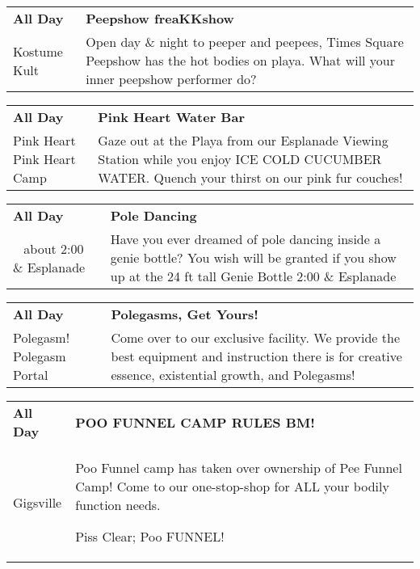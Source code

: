 \begin{tabular}{ p{1in} p{2.2in} }
    \textbf{All Day} & \textbf{Peepshow freaKKshow} \\
    Kostume Kult \newline  & Open day \& night to peeper and peepees, Times Square Peepshow has the hot bodies on playa. What will your inner peepshow performer do? \\
    \hline 
\end{tabular}
    
\begin{tabular}{ p{1in} p{2.2in} }
    \textbf{All Day} & \textbf{Pink Heart Water Bar} \\
    Pink Heart \newline Pink Heart Camp & Gaze out at the Playa from our Esplanade Viewing Station while you enjoy ICE COLD CUCUMBER WATER. Quench your thirst on our pink fur couches! \\
    \hline 
\end{tabular}
    
\begin{tabular}{ p{1in} p{2.2in} }
    \textbf{All Day} & \textbf{Pole Dancing} \\
    ~ \newline about 2:00 \& Esplanade & Have you ever dreamed of pole dancing inside a genie bottle? You wish will be granted if you show up at the 24 ft tall Genie Bottle 2:00 \& Esplanade \\
    \hline 
\end{tabular}
    
\begin{tabular}{ p{1in} p{2.2in} }
    \textbf{All Day} & \textbf{Polegasms, Get Yours!} \\
    Polegasm! \newline Polegasm Portal & Come over to our exclusive facility. We provide the best equipment and instruction there is for creative essence, existential growth, and Polegasms! \\
    \hline 
\end{tabular}
    
\begin{tabular}{ p{1in} p{2.2in} }
    \textbf{All Day} & \textbf{POO FUNNEL CAMP RULES BM!} \\
    Gigsville \newline  & Poo Funnel camp has taken over ownership of Pee Funnel Camp! Come to our one-stop-shop for ALL your bodily function needs.

Piss Clear;
Poo FUNNEL! \\
    \hline 
\end{tabular}
    
